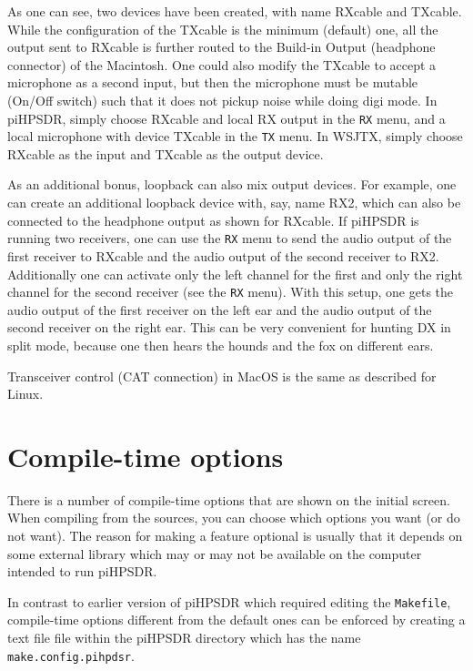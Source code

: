 \documentclass[12pt]{book}
\def\bltt#1{\texttt{\color{blue}#1}}
\def\grtt#1{\texttt{\color{magenta}#1}}
\def\pH{pi\-HPSDR\xspace}
\begin{document}
As one can see, two devices have been created, with name RXcable and TXcable.
While the configuration of the TXcable is the minimum (default) one, all the
output sent to RXcable is further routed to the Build-in Output (headphone
connector) of the Macintosh. One could also modify the TXcable to accept a
microphone as a second input, but then the microphone must be mutable
(On/Off switch) such that it does not pickup noise while doing digi mode.
In \pH, simply choose RXcable and local RX output in the \bltt{RX} menu,
and a local microphone with device TXcable in the \bltt{TX} menu. In WSJTX,
simply choose RXcable as the input and TXcable as the output device.

As an additional bonus, loopback can also mix output devices. For example, one can create
an additional loopback device with, say, name RX2, which can also be connected to
the headphone output as shown for RXcable. If \pH is running two receivers,
one can use the \bltt{RX} menu to send the audio output of the first receiver to RXcable
and the audio output of the second receiver to RX2. Additionally one can activate only
the left channel for the first and only the right channel for the second receiver
(see the \bltt{RX} menu). With this setup,
one gets the audio output of the first receiver on the left ear and the audio output of
the second receiver on the right ear. This can be very convenient for hunting DX in split mode,
because one then hears the hounds and the fox on different ears.

Transceiver control (CAT connection) in MacOS is the same as described for Linux.

\chapter{Compile-time options}
\label{sec:compiletime}

There is a number of compile-time options that are shown on the initial screen.
When compiling from the sources, you can choose which options you want (or do not want).
The reason for making a feature optional is usually that it depends on some external
library which may or may not be available on the computer intended  to run \pH.

In contrast to earlier version of \pH which required editing the \texttt{Makefile},
compile-time options different from the default ones can be enforced by
creating a text file
file within the \pH directory which has the name \grtt{make.config.pihpdsr}.
\end{document}
